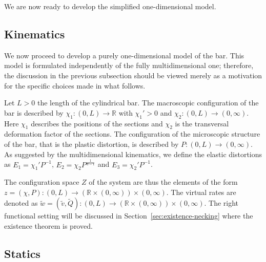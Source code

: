 \documentclass[a4paper,10pt,oneside]{amsbook}
\numberwithin{section}{chapter}
\numberwithin{equation}{chapter}
\theoremstyle{definition}
\begin{document}
We are now ready to develop the simplified one-dimensional model.

\subsection{Kinematics}

We now proceed to develop a purely one-dimensional model of the bar. This model is formulated independently of the fully multidimensional one; therefore, the discussion in the previous subsection should be viewed merely as a motivation for the specific choices made in what follows.

Let $L>0$ the length of the cylindrical bar. The macroscopic configuration of the bar is described by $\chi_1\colon(0,L)\to\mathbb{R}$ with $\chi_1'>0$ and $\chi_2\colon(0,L)\to(0,\infty)$. Here $\chi_1$ describes the positions of the sections and $\chi_2$ is the transversal deformation factor of the sections. The configuration of the microscopic structure of the bar, that is the plastic distortion, is described by $P\colon(0,L)\to(0,\infty)$. As suggested by the multidimensional kinematics, we define the elastic distortions as $E_1=\chi_1'P^{-1}$, $E_2=\chi_2P^{\frac{1}{d-1}}$ and $E_3=\chi_2'P^{-1}$.

The configuration space $Z$ of the system are thus the elements of the form $z=(\chi,P)\colon(0,L)\to(\mathbb{R}\times(0,\infty))\times(0,\infty)$. The virtual rates are denoted as $\tilde w=(\tilde v,\tilde Q)\colon(0,L)\to(\mathbb{R}\times(0,\infty))\times(0,\infty)$. The right functional setting will be discussed in Section~\ref{sec:existence-necking} where the existence theorem is proved.

\subsection{Statics}
\end{document}
